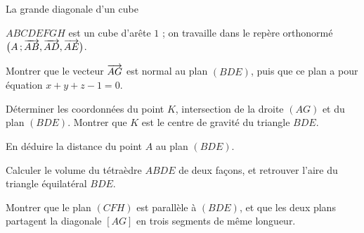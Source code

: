 \begin{exercice}[3]{La grande diagonale d'un cube}
\begin{codecote}[0.6]
$ABCDEFGH$ est un cube d'arête $1$ ; on travaille dans le repère orthonormé $\big(A\,{;}\,\overrightarrow{AB},\overrightarrow{AD},\overrightarrow{AE}\big)$.
\begin{questions}
  \item Montrer que le vecteur $\overrightarrow{AG}$ est normal au plan $(BDE)$, puis que ce plan a pour équation $x+y+z-1=0$.
  \item Déterminer les coordonnées du point $K$, intersection de la droite $(AG)$ et du plan $(BDE)$. Montrer que $K$ est le centre de
    gravité du triangle $BDE$.
  \item En déduire la distance du point $A$ au plan $(BDE)$.
  \item Calculer le volume du tétraèdre $ABDE$ de deux façons, et retrouver l'aire du triangle équilatéral $BDE$.
  \item Montrer que le plan $(CFH)$ est parallèle à $(BDE)$, et que les deux plans partagent la diagonale $[AG]$ en trois segments
    de même longueur.
\end{questions}
\cote
\centering
{}
\end{codecote}
\end{exercice}
